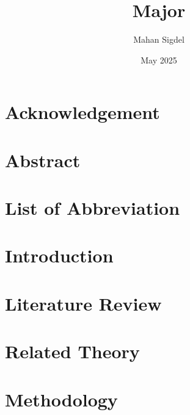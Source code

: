 \documentclass[12pt,a4paper]{report}
\title{Major}
\author{Mahan Sigdel}
\date{May 2025}
\begin{document}



\thispagestyle{empty}  %
\newpage


\thispagestyle{empty}  %
\newpage


\chapter*{Acknowledgement}
\label{acknowledgement}


\chapter*{Abstract}
\label{abstract}


\tableofcontents
\newpage

\listoffigures
{}
\newpage

\chapter*{List of Abbreviation}
\label{abbreviation}

\newpage


\chapter{Introduction}
\label{introduction}


\chapter{Literature Review}
\label{literaturereview}


\chapter{Related Theory}
\label{relatedtheory}


\chapter{Methodology}
\label{methodology}

\end{document}
